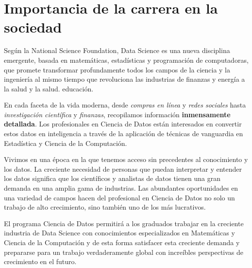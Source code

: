 \section{Importancia de la carrera en la sociedad}\label{sec:importance-in-the-society}

Según la National Science Foundation, Data Science es una nueva disciplina emergente, basada en matemáticas, estadí­sticas y programación de computadoras, que promete transformar profundamente todos los campos de la ciencia y la ingenierí­a al mismo tiempo que revoluciona las industrias de finanzas y energí­a a la salud y la salud. educación.

En cada faceta de la vida moderna, desde \emph{compras en lí­nea} y \emph{redes sociales} hasta \emph{investigación cientí­fica} y \emph{finanzas}, recopilamos información \textbf{inmensamente detallada}. Los profesionales en Ciencia de Datos están interesados en convertir estos datos en inteligencia a través de la aplicación de técnicas de vanguardia en Estadí­stica y Ciencia de la Computación.

Vivimos en una época en la que tenemos acceso sin precedentes al conocimiento y los datos. La creciente necesidad de personas que puedan interpretar y entender los datos significa que los cientí­ficos y analistas de datos tienen una gran demanda en una amplia gama de industrias. Las abundantes oportunidades en una variedad de campos hacen del profesional en Ciencia de Datos no solo un trabajo de alto crecimiento, sino también uno de los más lucrativos.

El programa Ciencia de Datos permitirá a los graduados trabajar en la creciente industria de Data Science con conocimientos especializados en Matemáticas y Ciencia de la Computación y de esta forma satisfacer esta creciente demanda y prepararse para un trabajo verdaderamente global con increí­bles perspectivas de crecimiento en el futuro.